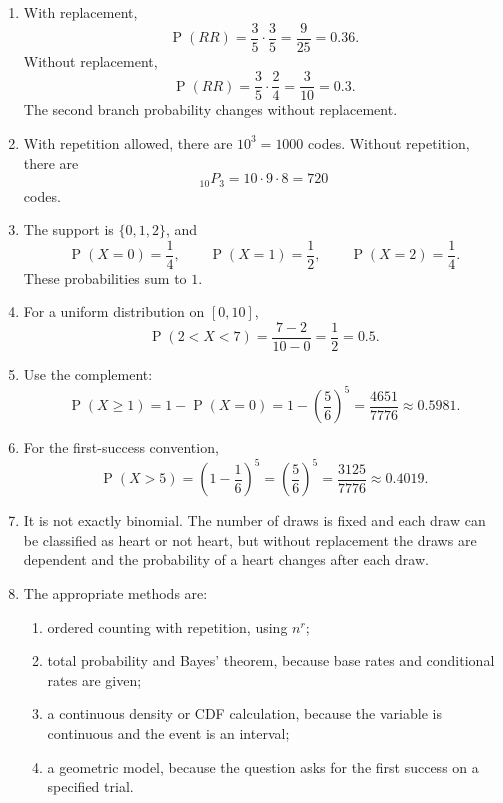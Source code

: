 \documentclass[11pt]{article}
\newcommand{\Pp}{\operatorname{P}}
\begin{document}
\begin{enumerate}
\[\]
Bayes' theorem gives
\[
\Pp(U\mid +)=\frac{(0.30)(0.80)}{0.38}=\frac{0.24}{0.38}
=\frac{12}{19}\approx0.6316.
\]
\item With replacement,
\[
\Pp(RR)=\frac35\cdot\frac35=\frac{9}{25}=0.36.
\]
Without replacement,
\[
\Pp(RR)=\frac35\cdot\frac24=\frac{3}{10}=0.3.
\]
The second branch probability changes without replacement.
\item With repetition allowed, there are $10^3=1000$ codes.  Without repetition,
there are
\[
{}_{10}P_3=10\cdot9\cdot8=720
\]
codes.
\item The support is $\{0,1,2\}$, and
\[
\Pp(X=0)=\frac14,
\qquad
\Pp(X=1)=\frac12,
\qquad
\Pp(X=2)=\frac14.
\]
These probabilities sum to $1$.
\item For a uniform distribution on $[0,10]$,
\[
\Pp(2<X<7)=\frac{7-2}{10-0}=\frac12=0.5.
\]
\item Use the complement:
\[
\Pp(X\ge1)=1-\Pp(X=0)=1-\left(\frac56\right)^5
=\frac{4651}{7776}\approx0.5981.
\]
\item For the first-success convention,
\[
\Pp(X>5)=\left(1-\frac16\right)^5=\left(\frac56\right)^5
=\frac{3125}{7776}\approx0.4019.
\]
\item It is not exactly binomial.  The number of draws is fixed and each draw can
be classified as heart or not heart, but without replacement the draws are
dependent and the probability of a heart changes after each draw.
\item The appropriate methods are:
\begin{enumerate}[label=(\alph*)]
\item ordered counting with repetition, using $n^r$;
\item total probability and Bayes' theorem, because base rates and conditional
rates are given;
\item a continuous density or CDF calculation, because the variable is continuous
and the event is an interval;
\item a geometric model, because the question asks for the first success on a
specified trial.
\end{enumerate}
\end{enumerate}
\end{document}
